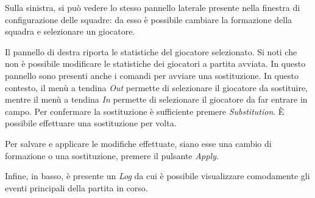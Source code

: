 Sulla sinistra, si può vedere lo stesso pannello laterale presente nella finestra di configurazione delle squadre: da esso è possibile cambiare la formazione della squadra e selezionare un giocatore. 

Il pannello di destra riporta le statistiche del giocatore selezionato. Si noti che non è possibile modificare le statistiche dei giocatori a partita avviata. In questo pannello sono presenti anche i comandi per avviare una sostituzione. In questo contesto, il menù a tendina \emph{Out} permette di selezionare il giocatore da sostituire, mentre il menù a tendina \emph{In} permette di selezionare il giocatore da far entrare in campo. Per confermare la sostituzione è sufficiente premere \emph{Substitution}. \`{E} possibile effettuare una sostituzione per volta.

Per salvare e applicare le modifiche effettuate, siano esse una cambio di formazione o una sostituzione, premere il pulsante \emph{Apply}. 

Infine, in basso, è presente un \emph{Log} da cui è possibile visualizzare comodamente gli eventi principali della partita in corso.